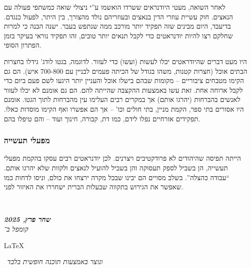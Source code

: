 \documentclass[]{article}
\newcommand\en[1] {\begin{otherlanguage}{english}#1\end{otherlanguage}}
\newcommand\ndoc  {\dotfill \\ \vfil {\begin{center}
            {\textbf{\textit{שחר פרץ, 2025}} \\
                \scriptsize \textit{קומפל ב־}\en{\LaTeX}\,\textit{ ונוצר באמצעות תוכנה חופשית בלבד}}
    \end{center}} \vfil	}
\begin{document}
    לאחר השואה, מעטי היודנראים ששרדו הואשמו ע''י ניצולי שואה כמשתפי פעולה עם הנאצים. חוק עשיית עוזרי הדין בנאצים ובעוזריהם נולד מהצורך, בין היתר, לפעול כנגדם. בדיעבד, היום מבינים שזה תפקיד יותר מורכב ממה שנתפש בעבר. ישנה הבנה כי למרות שחלקם רצו להיות יודנראטים כדי לקבל תנאים יותר טובים, זהו תפקיד נוראי בעיקר בזמן הפתרון הסופי. 
    
    היו מעט דברים שהיודראטים יכלו לעשות (ועשו) כדי לעזור. לדוגמה, בגטו לודג' גידלו בחצרות הבתים אוכל (חצרות קטנות, משהו בגודל של הכיתה פעמים לבניין עם 700-800 איש). הם גם הקימו מטבחים ציבוריים – מקומות שבהם בישלו אוכל והעניין יותר היגעו לשם פעם ביום כדי לקבל ארוחה אחת. זאת עשו באמצעות ההקצבה שהייתה להם. הם גם אומנם לא יכלו לעזור לאנשים בהברחות (יהרגו אותם) אך במקרים רבים העלימו עין מהברחות לתוך הגטו. אומנם היו אסורים בתי ספר, הקמת מניין, בתי חולים וכו' – אך הם אפשרו ואף הקימו מוסדות כאלו. תפקידים אזרחיים נפלו לידם, כמו דת, קבורה, חינוך ועוד – והם טיפלו בהם. 
    
    \subsubsection{מפעלי תעשייה}
    הייתה תפיסה שהיהודים לא פרודקטיבים ויצרנים. לכן יודנראטים רבים עסקו בהקמת מפעלי תעשייה, הן בשביל לספק תעסוקה והן בשביל להועיל לנאצים ולקוות שלא יהרגו אותם. ``עבודה כהצלה''. בשלב מסויים הם יבינו שבכל מקרה ירצחו את כולם, וניסו לדחות כמו שאפשר את הגירוש בתקווה שבעלות הברית ישחררו את האיזור לפני. 
    
    
    \ndoc
\end{document}
